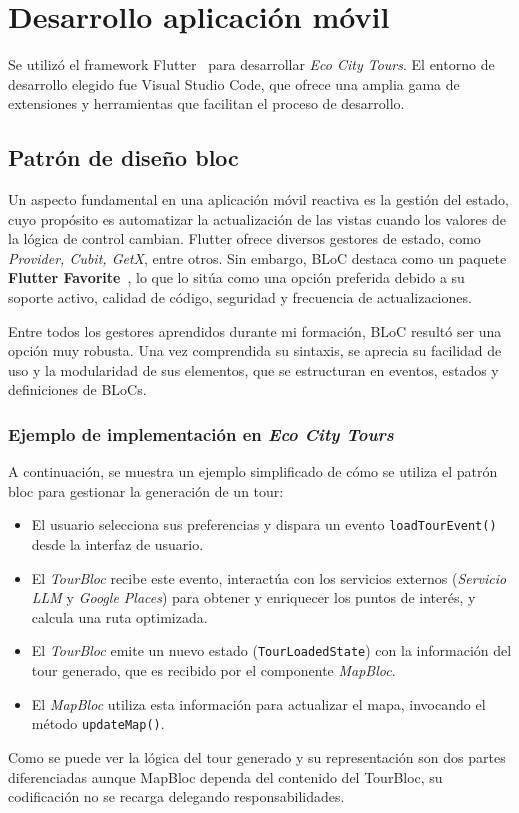 \section{Desarrollo aplicación móvil}
Se utilizó el framework Flutter~\cite{flutter} para desarrollar \textit{Eco City Tours}. El entorno de desarrollo elegido fue Visual Studio Code, que ofrece una amplia gama de extensiones y herramientas que facilitan el proceso de desarrollo.
	
	\subsection{Patrón de diseño \acrfull{bloc}}
	Un aspecto fundamental en una aplicación móvil reactiva es la gestión del estado, cuyo propósito es automatizar la actualización de las vistas cuando los valores de la lógica de control cambian. Flutter ofrece diversos gestores de estado, como \textit{Provider, Cubit, GetX}, entre otros. Sin embargo, BLoC destaca como un paquete \textbf{Flutter Favorite}~\cite{bloc_package}, lo que lo sitúa como una opción preferida debido a su soporte activo, calidad de código, seguridad y frecuencia de actualizaciones.
	
	Entre todos los gestores aprendidos durante mi formación, BLoC resultó ser una opción muy robusta. Una vez comprendida su sintaxis, se aprecia su facilidad de uso y la modularidad de sus elementos, que se estructuran en eventos, estados y definiciones de BLoCs.
	\subsubsection{Ejemplo de implementación en \textit{Eco City Tours}}
	A continuación, se muestra un ejemplo simplificado de cómo se utiliza el patrón \acrshort{bloc} para gestionar la generación de un tour:
	\begin{itemize}
		\item El usuario selecciona sus preferencias y dispara un evento \texttt{loadTourEvent()} desde la interfaz de usuario.
		\item El \textit{TourBloc} recibe este evento, interactúa con los servicios externos (\textit{Servicio LLM} y \textit{Google Places}) para obtener y enriquecer los puntos de interés, y calcula una ruta optimizada.
		\item El \textit{TourBloc} emite un nuevo estado (\texttt{TourLoadedState}) con la información del tour generado, que es recibido por el componente \textit{MapBloc}.
		\item El \textit{MapBloc} utiliza esta información para actualizar el mapa, invocando el método \texttt{updateMap()}.
	\end{itemize}
	Como se puede ver la lógica del tour generado y su representación son dos partes diferenciadas aunque MapBloc dependa del contenido del TourBloc, su codificación no se recarga delegando responsabilidades.
		
